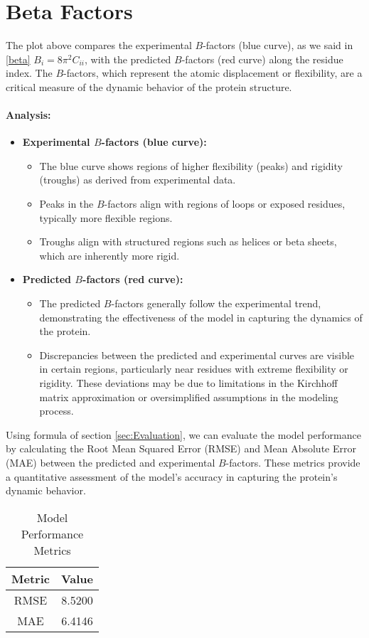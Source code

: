 \documentclass[English, Lau, oneside]{sapthesis}
\begin{document}
\newpage
\section{Beta Factors}
\noindent The plot above compares the experimental \( B \)-factors (blue curve), as we said in \eqref{beta} $B_i = 8\pi^2 C_{ii}$, with the predicted \( B \)-factors (red curve) along the residue index. The \( B \)-factors, which represent the atomic displacement or flexibility, are a critical measure of the dynamic behavior of the protein structure.
\paragraph{Analysis:}
\begin{itemize}
    \item \textbf{Experimental \( B \)-factors (blue curve):}
    \begin{itemize}
        \item The blue curve shows regions of higher flexibility (peaks) and rigidity (troughs) as derived from experimental data.
        \item Peaks in the \( B \)-factors align with regions of loops or exposed residues, typically more flexible regions.
        \item Troughs align with structured regions such as helices or beta sheets, which are inherently more rigid.
    \end{itemize}

    \item \textbf{Predicted \( B \)-factors (red curve):}
    \begin{itemize}
        \item The predicted \( B \)-factors generally follow the experimental trend, demonstrating the effectiveness of the model in capturing the dynamics of the protein.
        \item Discrepancies between the predicted and experimental curves are visible in certain regions, particularly near residues with extreme flexibility or rigidity. These deviations may be due to limitations in the Kirchhoff matrix approximation or oversimplified assumptions in the modeling process.
    \end{itemize}
\end{itemize}
Using formula of section \ref{sec:Evaluation}, we can evaluate the model performance by calculating the Root Mean Squared Error (RMSE) and Mean Absolute Error (MAE) between the predicted and experimental \( B \)-factors. 
These metrics provide a quantitative assessment of the model's accuracy in capturing the protein's dynamic behavior.
\begin{table}[h!]
    \centering
    \begin{tabular}{|c|c|}
    \hline
    \textbf{Metric} & \textbf{Value} \\ \hline
    RMSE & 8.5200 \\ \hline
    MAE  & 6.4146 \\ \hline
    \end{tabular}
    \caption{Model Performance Metrics}
    \label{tab:model_metrics}
\end{table}
\end{document}
